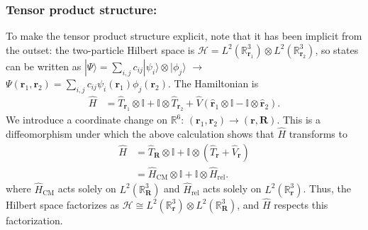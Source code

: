 \subsubsection{Tensor product structure:}
To make the tensor product structure explicit, note that it has been implicit from the outset: the two-particle Hilbert space is $\mathcal{H}=L^2(\mathbb{R}^3_{\mathbf{r}_1})\otimes L^2(\mathbb{R}^{3}_{\mathbf{r}_2})$, so states can be written as $|\Psi\rangle = \sum_{i,j}c_{ij}|\psi_i\rangle\otimes|\phi_j\rangle$ $\rightarrow$ $\Psi(\mathbf{r}_1, \mathbf{r}_2)=\sum_{i,j}c_{ij}\psi_i(\mathbf{r}_1)\phi_j(\mathbf{r}_2)$. The Hamiltonian is 
\begin{align*}
    \hat{H} &= \hat{T}_{\mathbf{r}_1}\otimes \mathbb{I} + \mathbb{I}\otimes \hat{T}_{\mathbf{r}_2} + \hat{V}(\hat{\mathbf{r}}_1\otimes\mathbb{I}-\mathbb{I}\otimes \hat{\mathbf{r}}_2).
\end{align*}
We introduce a coordinate change on $\mathbb{R}^6$: $(\mathbf{r}_1, \mathbf{r}_2)\rightarrow(\mathbf{r}, \mathbf{R})$. This is a diffeomorphism under which the above calculation shows that $\hat{H}$ transforms to 
\begin{align*}
    \hat{H}&= \hat{T}_{\mathbf{R}}\otimes \mathbb{I} + \mathbb{I}\otimes(\hat{T}_{\mathbf{r}} + \hat{V}_{\mathbf{r}})\\
    &=\hat{H}_{\text{CM}}\otimes\mathbb{I} + \mathbb{I}\otimes \hat{H}_{\text{rel}}.
\end{align*}
where $\hat{H}_{\text{CM}}$ acts solely on $L^2(\mathbb{R}^3_{\mathbf{R}})$ and $\hat{H}_{\text{rel}}$ acts solely on $L^2(\mathbb{R}^3_{\mathbf{r}})$. Thus, the Hilbert space factorizes as $\mathcal{H}\cong L^2(\mathbb{R}^3_{\mathbf{r}})\otimes L^2(\mathbb{R}^3_{\mathbf{R}})$, and $\hat{H}$ respects this factorization.\\

